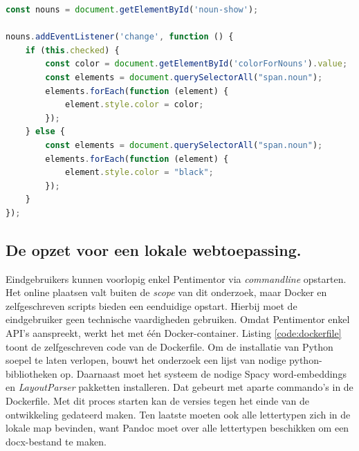 \begin{lstlisting}[language=javascript, caption={Zelfstandige naamwoorden in het scholierencomponent markeren.}, label={code:frontend-mark-pos-tag}]
const nouns = document.getElementById('noun-show');

nouns.addEventListener('change', function () {
	if (this.checked) {
		const color = document.getElementById('colorForNouns').value;
		const elements = document.querySelectorAll("span.noun");
		elements.forEach(function (element) {
			element.style.color = color;
		});
	} else {
		const elements = document.querySelectorAll("span.noun");
		elements.forEach(function (element) {
			element.style.color = "black";
		});
	}
});
\end{lstlisting}

\subsection{De opzet voor een lokale webtoepassing.}

Eindgebruikers kunnen voorlopig enkel Pentimentor via \textit{commandline} opstarten. Het online plaatsen valt buiten de \textit{scope} van dit onderzoek, maar Docker en zelfgeschreven scripts bieden een eenduidige opstart. Hierbij moet de eindgebruiker geen technische vaardigheden gebruiken. Omdat Pentimentor enkel API's aanspreekt, werkt het met één Docker-container. Listing \ref{code:dockerfile} toont de zelfgeschreven code van de Dockerfile. Om de installatie van Python soepel te laten verlopen, bouwt het onderzoek een lijst van nodige python-bibliotheken op. Daarnaast moet het systeem de nodige Spacy word-embeddings en \textit{LayoutParser} pakketten installeren. Dat gebeurt met aparte commando's in de Dockerfile. Met dit proces starten kan de versies tegen het einde van de ontwikkeling gedateerd maken. Ten laatste moeten ook alle lettertypen zich in de lokale map bevinden, want Pandoc moet over alle lettertypen beschikken om een docx-bestand te maken.

